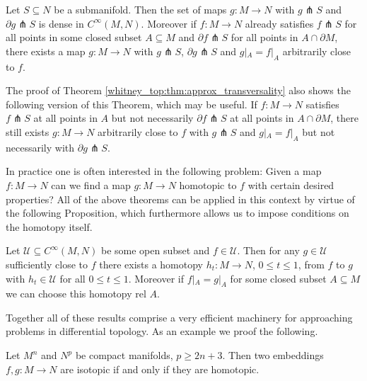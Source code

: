 \begin{theorem}[Transversality]
    \label{whitney_top:thm:approx_transversality}
    Let $S \subseteq N$ be a submanifold. Then the set of maps $g \colon M \to N$ with $g \pitchfork S$ and $\partial g \pitchfork S$ is dense in $C^\infty(M,N)$. Moreover if $f \colon M \to N$ already satisfies $f \pitchfork S$ for all points in some closed subset $A \subseteq M$ and $\partial f \pitchfork S$ for all points in $A \cap \partial M$, there exists a map $g \colon M \to N$ with $g \pitchfork S$, $\partial g \pitchfork S$ and $g|_A = f|_A$ arbitrarily close to $f$.
\end{theorem}

\begin{remark}
    The proof of Theorem \ref{whitney_top:thm:approx_transversality} also shows the following version of this Theorem, which may be useful. If $f \colon M \to N$ satisfies $f \pitchfork S$ at all points in $A$ but not necessarily $\partial f \pitchfork S$ at all points in $A \cap \partial M$, there still exists $g \colon M \to N$ arbitrarily close to $f$ with $g \pitchfork S$ and $g|_A = f|_A$ but not necessarily with $\partial g \pitchfork S$.
\end{remark}

In practice one is often interested in the following problem: Given a map $f \colon M \to N$ can we find a map $g \colon M \to N$ homotopic to $f$ with certain desired properties? All of the above theorems can be applied in this context by virtue of the following Proposition, which furthermore allows us to impose conditions on the homotopy itself.

\begin{proposition}
    \label{whitney_top:prop:homotopy_construction}
    Let $\mathcal{U} \subseteq  C^\infty(M,N)$ be some open subset and $f \in \mathcal{U}$. Then for any $g \in \mathcal{U}$ sufficiently close to $f$ there exists a homotopy $h_t \colon M \to N$, $0 \leq t \leq 1$, from $f$ to $g$ with $h_t \in \mathcal{U}$ for all $0 \leq t \leq 1$. Moreover if $f|_A = g|_A$ for some closed subset $A \subseteq M$ we can choose this homotopy rel $A$.
\end{proposition}

Together all of these results comprise a very efficient machinery for approaching problems in differential topology. As an example we proof the following.

\begin{corollary}
    Let $M^n$ and $N^p$ be compact manifolds, $p \geq 2n+3$. Then two embeddings $f,g \colon M \to N$ are isotopic if and only if they are homotopic.
\end{corollary}

